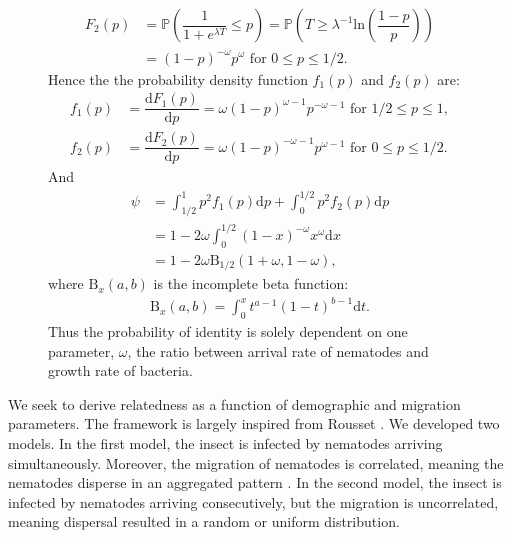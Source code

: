 \documentclass[10pt]{article}
\newcommand{\ud}{{\mathrm{d}}}
\newcommand{\pr}{{\mathbb{P}}}
\newcommand{\psic}{\psi}
\begin{document}
\begin{multicols}{2}
\begin{figure}[hbt!]
\begin{mdframed}
\begin{multicols}{2}
  \begin{align}
  F_2(p) &= \pr \left(\dfrac{1}{1+e^{\lambda T}} \leq p\right) = \pr \left(T \geq \lambda^{-1} \mathrm{ln}\left( \dfrac{1-p}{p} \right) \right) \nonumber \\
  &= (1-p)^{-\omega} p^\omega \text{ for } 0 \leq p \leq 1/2.
  \end{align}
  Hence the the probability density function $f_1(p)$ and $f_2(p)$ are:
  \begin{align}
  f_1(p) &= \dfrac{ \ud F_1(p) }{ \ud p} =  \omega (1-p)^{\omega-1} p^{-\omega-1}  \text{ for } 1/2 \leq p \leq 1,\\
  f_2(p) &= \dfrac{ \ud F_2(p) }{ \ud p} =  \omega (1-p)^{-\omega-1} p^{\omega-1} \text{ for } 0 \leq p \leq 1/2.
  \end{align}
  And
  \begin{align}
  \psic &= \int_{1/2}^{1} p^2 f_1(p) \ud p + \int_{0}^{1/2} p^2 f_2(p) \ud p \\
  &= 1 -2  \omega \int_{0}^{1/2}  (1-x)^{-\omega} x^{\omega}  \ud x \\
  &= 1- 2 \omega \mathrm{B}_{1/2}(1+\omega,1-\omega),
  \end{align}
  where $\mathrm{B}_x(a,b)$ is the incomplete beta function:
\begin{align}
\mathrm{B}_x(a,b) = \int_0^x t^{a-1}(1-t)^{b-1} \ud t.
\end{align}
  Thus the probability of identity is solely dependent on one parameter, $\omega$, the ratio between arrival rate of nematodes and growth rate of bacteria.
 \end{multicols}
\end{mdframed}
\end{figure}
We seek to derive relatedness as a function of demographic and migration parameters.
The framework is largely inspired from Rousset \cite{rousset2004genetic}.
We developed two models.
In the first model, the insect is infected by nematodes arriving simultaneously. 
Moreover, the migration of nematodes is correlated, meaning the nematodes disperse in an aggregated pattern \cite{shapiro2013aggregative}.
In the second model, the insect is infected by nematodes arriving consecutively, but the migration is uncorrelated, meaning dispersal resulted in a random or uniform distribution.

\end{multicols}
\end{document}

